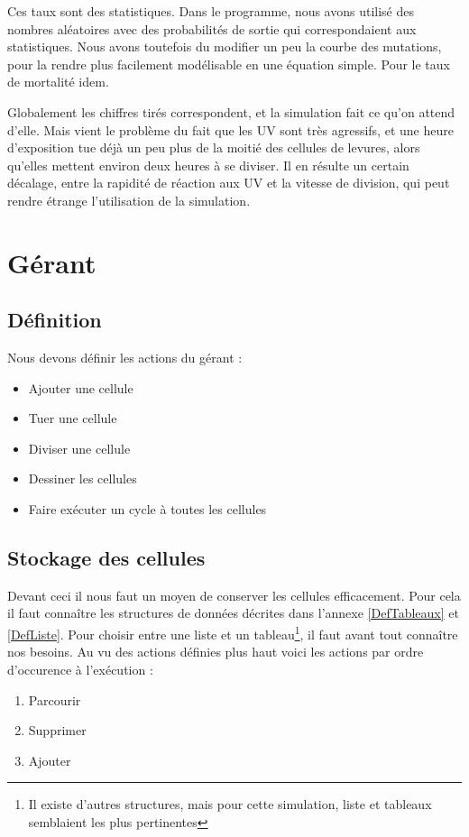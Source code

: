   Ces taux sont des statistiques. Dans le programme, nous avons utilisé des nombres aléatoires avec des probabilités de sortie qui correspondaient aux statistiques. Nous avons toutefois du modifier un peu la courbe des mutations, pour la rendre plus facilement modélisable en une équation simple. Pour le taux de mortalité idem.
  
  Globalement les chiffres tirés correspondent, et la simulation fait ce qu'on attend d'elle. Mais vient le problème du fait que les UV sont très agressifs, et une heure d'exposition tue déjà un peu plus de la moitié des cellules de levures, alors qu'elles mettent environ deux heures à se diviser. Il en résulte un certain décalage, entre la rapidité de réaction aux UV et la vitesse de division, qui peut rendre étrange l'utilisation de la simulation.

\section{Gérant}
\subsection{Définition}
Nous devons définir les actions du gérant : 
\begin{itemize}
	\item Ajouter une cellule
	\item Tuer une cellule
	\item Diviser une cellule
	\item Dessiner les cellules
	\item Faire exécuter un cycle à toutes les cellules
\end{itemize}

\subsection{Stockage des cellules}

Devant ceci il nous faut un moyen de conserver les cellules efficacement.
Pour cela il faut connaître les structures de données décrites dans l'annexe \ref{DefTableaux} et \ref{DefListe}. Pour choisir entre une liste et un tableau\footnote{Il existe d'autres structures, mais pour cette simulation, liste et tableaux semblaient les plus pertinentes}, il faut avant tout connaître nos besoins. Au vu des actions définies plus haut voici les actions par ordre d'occurence à l'exécution : 
\begin{enumerate}
	\item Parcourir 
	\item Supprimer
	\item Ajouter
\end{enumerate}

